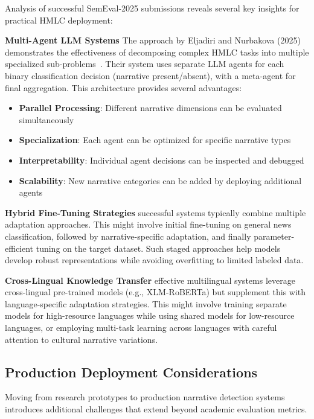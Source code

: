 Analysis of successful SemEval-2025 submissions reveals several key insights for practical HMLC deployment:

\textbf{Multi-Agent LLM Systems} The approach by Eljadiri and Nurbakova (2025) demonstrates the effectiveness of decomposing complex HMLC tasks into multiple specialized sub-problems~\cite{eljadiri-nurbakova-2025-team}. Their system uses separate LLM agents for each binary classification decision (narrative present/absent), with a meta-agent for final aggregation. This architecture provides several advantages:

\begin{itemize}
    \item \textbf{Parallel Processing}: Different narrative dimensions can be evaluated simultaneously
    \item \textbf{Specialization}: Each agent can be optimized for specific narrative types
    \item \textbf{Interpretability}: Individual agent decisions can be inspected and debugged
    \item \textbf{Scalability}: New narrative categories can be added by deploying additional agents
\end{itemize}

\textbf{Hybrid Fine-Tuning Strategies} successful systems typically combine multiple adaptation approaches. This might involve initial fine-tuning on general news classification, followed by narrative-specific adaptation, and finally parameter-efficient tuning on the target dataset. Such staged approaches help models develop robust representations while avoiding overfitting to limited labeled data.

\textbf{Cross-Lingual Knowledge Transfer} effective multilingual systems leverage cross-lingual pre-trained models (e.g., XLM-RoBERTa) but supplement this with language-specific adaptation strategies. This might involve training separate models for high-resource languages while using shared models for low-resource languages, or employing multi-task learning across languages with careful attention to cultural narrative variations.

\subsection{Production Deployment Considerations}

Moving from research prototypes to production narrative detection systems introduces additional challenges that extend beyond academic evaluation metrics.

